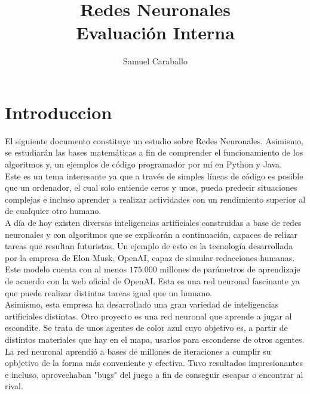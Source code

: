 \documentclass[12pt]{article}
\author{Samuel Caraballo}
\title{Redes Neuronales\\
\large Evaluaci\'{o}n Interna
}
\date{\vspace{-5ex}} %
\begin{document}
    \maketitle

    \section*{Introduccion}
    \begin{onehalfspace}
    
    
      El siguiente documento constituye un estudio sobre 
      Redes Neuronales. Asimismo, se estudiar\'{a}n las bases 
      matem\'{a}ticas a fin de comprender el funcionamiento de los
      algoritmos y, un ejemplos de c\'{o}digo programador
      por m\'{i} en Python y Java.\\
      Este es un tema interesante ya que a trav\'{e}s de simples
      l\'{i}neas de c\'{o}digo es posible que un ordenador, el
      cual solo entiende ceros y unos, pueda predecir situaciones
      complejas e incluso aprender a realizar actividades con un rendimiento
      superior al de cualquier otro humano. \\
        
      A d\'{i}a de hoy existen diversas inteligencias artificiales
      construidas a base de redes neuronales y con algoritmos que se
      explicar\'{a}n a continuaci\'{o}n, capaces de relizar tareas que
      resultan futuristas. Un ejemplo de esto es la tecnolog\'{i}a 
      desarrollada por la empresa de Elon Musk, OpenAI, capaz
      de simular redacciones humanas. Este modelo cuenta con al menos
      $175.000$ millones de par\'{a}metros de aprendizaje de acuerdo con 
      la web oficial de OpenAI. Esta es una red neuronal 
      fascinante ya que puede realizar distintas tareas
      igual que un humano.\\
      Asimismo, esta empresa ha desarrollado una gran 
      variedad de inteligencias artificiales distintas.
      Otro proyecto es una red neuronal que aprende a 
      jugar al escondite. Se trata de unos agentes 
      de color azul cuyo objetivo es, a partir de 
      distintos materiales que hay en el mapa, usarlos
      para esconderse de otros agentes. La red neuronal
      aprendi\'{o} a bases de millones de iteraciones
      a cumplir su opbjetivo de la forma m\'{a}s conveniente 
      y efectiva. Tuvo resultados impresionantes e incluso, 
      aprovechaban "bugs" del juego a fin de conseguir
      escapar o encontrar al rival.\\


\end{onehalfspace}
\end{document}

